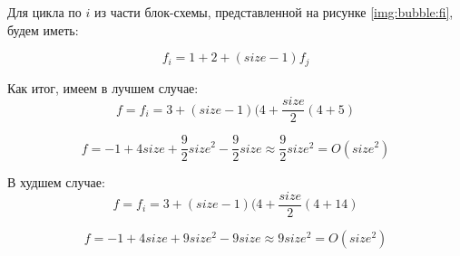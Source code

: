 \documentclass[12pt]{report}
\begin{document}
Для цикла по $i$ из части блок-схемы, представленной на рисунке \ref{img:bubble:fi}, будем иметь:

\begin{equation}
f_{i} = 1 + 2 + (size - 1)f_{j}
\end{equation}

Как итог, имеем в лучшем случае:
\begin{equation}
f = f_{i} = 3 + (size-1)(4 + \frac{size}{2}(4 + 5)
\end{equation}

\begin{equation}
f = -1 + 4size + \frac{9}{2}{size}^2 - \frac{9}{2}size \approx \frac{9}{2}{size^2} = O({size}^2)
\end{equation}

В худшем случае:
\begin{equation}
f = f_{i} = 3 + (size-1)(4 + \frac{size}{2}(4 + 14)
\end{equation}

\begin{equation}
f = -1 + 4size + 9{size}^2 - 9size \approx 9{size^2} = O({size}^2)
\end{equation}
\end{document}
